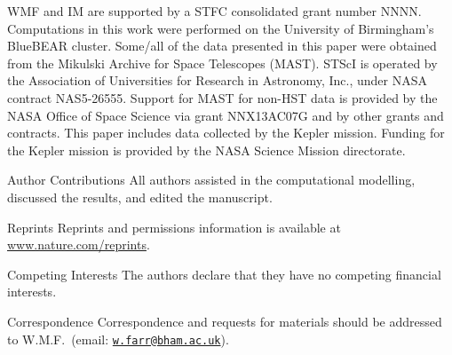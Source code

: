 \documentclass{nature}
\newcommand{\email}[1]{\href{mailto:#1}{\nolinkurl{#1}}}
\begin{document}


\begin{addendum}
\item WMF and IM are supported by a STFC consolidated grant number
  NNNN.  Computations in this work were performed on the University of
  Birmingham's BlueBEAR cluster.  Some/all of the data presented in
  this paper were obtained from the Mikulski Archive for Space
  Telescopes (MAST). STScI is operated by the Association of
  Universities for Research in Astronomy, Inc., under NASA contract
  NAS5-26555. Support for MAST for non-HST data is provided by the
  NASA Office of Space Science via grant NNX13AC07G and by other
  grants and contracts.  This paper includes data collected by the
  Kepler mission. Funding for the Kepler mission is provided by the
  NASA Science Mission directorate.
\item [Author Contributions] All authors assisted in the computational
  modelling, discussed the results, and edited the manuscript.
\item [Reprints] Reprints and permissions information is available at
  \url{www.nature.com/reprints}.
\item[Competing Interests] The authors declare that they have no
  competing financial interests.
\item[Correspondence] Correspondence and requests for materials should
  be addressed to W.M.F.\ (email: \email{w.farr@bham.ac.uk}).
\end{addendum}
\end{document}
